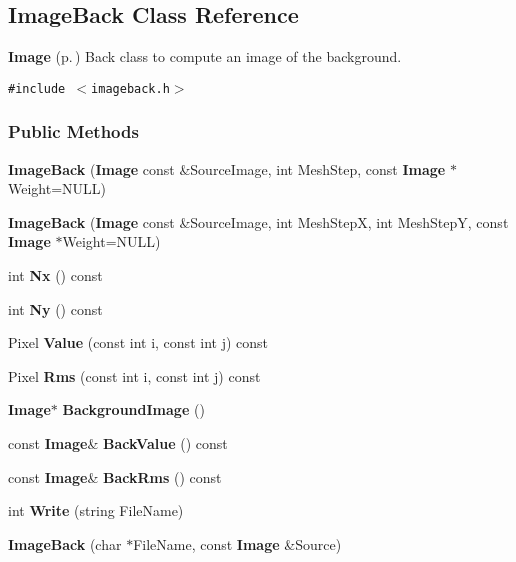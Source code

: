 \subsection{Image\-Back  Class Reference}
\label{class_imageback}
{\bf Image} {\rm (p.\,\pageref{class_image})} Back class to compute an image of the background. 


{\tt \#include $<$imageback.h$>$}

\subsubsection*{Public Methods}
\begin{CompactItemize}
\item 
{\bf Image\-Back} ({\bf Image} const \&Source\-Image, int Mesh\-Step, const {\bf Image} $\ast$Weight=NULL)
\item 
{\bf Image\-Back} ({\bf Image} const \&Source\-Image, int Mesh\-Step\-X, int Mesh\-Step\-Y, const {\bf Image} $\ast$Weight=NULL)
\item 
{}
int {\bf Nx} () const\label{class_imageback_a2}

\item 
{}
int {\bf Ny} () const\label{class_imageback_a3}

\item 
Pixel {\bf Value} (const int i, const int j) const
\item 
Pixel {\bf Rms} (const int i, const int j) const
\item 
{\bf Image}$\ast$ {\bf Background\-Image} ()
\item 
{}
const {\bf Image}\& {\bf Back\-Value} () const\label{class_imageback_a7}

\item 
{}
const {\bf Image}\& {\bf Back\-Rms} () const\label{class_imageback_a8}

\item 
{}
int {\bf Write} (string File\-Name)\label{class_imageback_a9}

\item 
{}
{\bf Image\-Back} (char $\ast$File\-Name, const {\bf Image} \&Source)\label{class_imageback_a10}

\end{CompactItemize}


